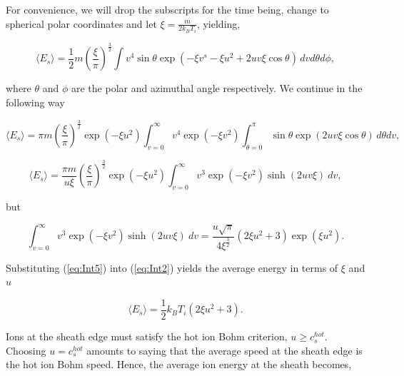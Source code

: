 \documentclass{article}
\begin{document}
\smallskip
    
For convenience, we will drop the subscripts for the time being,
change to spherical polar coordinates and let $\xi = \frac{m}{2k_B T_i}$, yielding,

\begin{equation}\label{eq:Int2}
\langle E_{s} \rangle = \frac{1}{2}m \left(\frac{\xi}{\pi}\right)^{\frac{3}{2}}
\int v^4 \sin{\theta}\exp{\left(-\xi v^s - \xi u^2 + 2uv \xi \cos{\theta}\right)} \,dv d\theta d\phi,
\end{equation}

\noindent where $\theta$ and $\phi$ are the polar and azimuthal angle respectively. We continue
in the following way

\begin{equation}\label{eq:Int3}
\langle E_{s} \rangle = \pi m \left(\frac{\xi}{\pi}\right)^{\frac{3}{2}} \exp{\left(- \xi u^2\right)}
\int_{v = 0}^{\infty} v^4\exp{\left(-\xi v^2\right)} \int_{\theta = 0}^{\pi} \sin{\theta}\exp{\left(2uv \xi \cos{\theta}\right)} \,d\theta dv,
\end{equation}

\begin{equation}\label{eq:Int4}
\langle E_{s} \rangle = \frac{\pi m}{u\xi} \left(\frac{\xi}{\pi}\right)^{\frac{3}{2}} \exp{\left(- \xi u^2\right)}
\int_{v = 0}^{\infty} v^3\exp{\left(-\xi v^2\right)}\sinh{\left(2uv\xi\right)} \ dv,
\end{equation}

\noindent but

\begin{equation}\label{eq:Int5}
\int_{v = 0}^{\infty} v^3\exp{\left(-\xi v^2\right)}\sinh{\left(2uv\xi\right)} \ dv = \frac{u\sqrt{\pi}}{4\xi^{\frac{3}{2}}} 
\left(2\xi u^2 + 3\right) \exp{\left(\xi u^2\right)}.
\end{equation}

\smallskip

\noindent Substituting (\ref{eq:Int5}) into (\ref{eq:Int2}) yields the average energy 
in terms of $\xi$ and $u$ 

\begin{equation}\label{eq:AverageEnergy}
\langle E_{s} \rangle = \frac{1}{2}k_B T_i \left(2\xi u^2 + 3\right).
\end{equation}

Ions at the sheath edge must satisfy the hot ion Bohm criterion, $u \geq c_s^{hot}$. 
Choosing $u = c_s^{hot}$ amounts to saying that the average speed at the sheath edge 
is the hot ion Bohm speed. Hence, the average ion energy at the sheath becomes,
\end{document}
